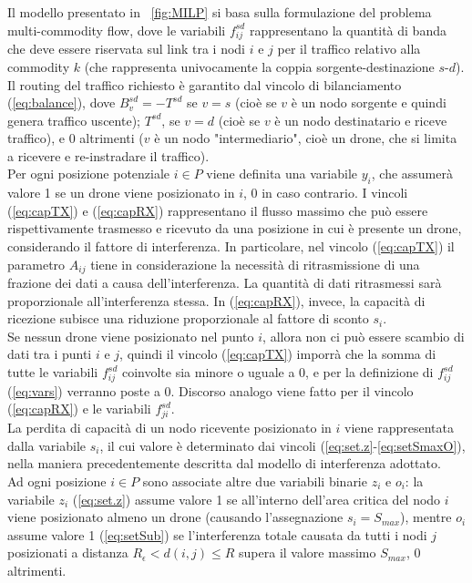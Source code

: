 %
Il modello presentato in \figurename\ \ref{fig:MILP} si basa sulla formulazione del problema multi-commodity flow, dove le variabili $f^{sd}_{ij}$ rappresentano la quantità di banda che deve essere riservata sul link tra i nodi $i$ e $j$ per il traffico relativo alla commodity $k$ (che rappresenta univocamente la coppia sorgente-destinazione $s$-$d$). \\
Il routing del traffico richiesto è garantito dal vincolo di bilanciamento (\ref{eq:balance}), dove $B^{sd}_{v} = - T^{sd}$ se $v = s$ (cioè se $v$ è un nodo sorgente e quindi genera traffico uscente); $T^{sd}$, se $v = d$ (cioè se $v$ è un nodo destinatario e riceve traffico), e 0 altrimenti ($v$ è un nodo "intermediario", cioè un drone, che si limita a ricevere e re-instradare il traffico). \\
Per ogni posizione potenziale $i \in P$ viene definita una variabile $y_i$, che assumerà valore 1 se un drone viene posizionato in $i$, 0 in caso contrario.   
I vincoli (\ref{eq:capTX}) e (\ref{eq:capRX}) rappresentano il flusso massimo che può essere rispettivamente trasmesso e ricevuto da una posizione in cui è presente un drone, considerando il fattore di interferenza. In particolare, nel vincolo (\ref{eq:capTX}) il parametro $A_{ij}$ tiene in considerazione la necessità di ritrasmissione di una frazione dei dati a causa dell'interferenza. 
La quantità di dati ritrasmessi sarà proporzionale all'interferenza stessa. In (\ref{eq:capRX}), invece, la capacità di ricezione subisce una riduzione proporzionale al fattore di sconto $s_i$. \\
Se nessun drone viene posizionato nel punto $i$, allora non ci può essere scambio di dati tra i punti $i$ e $j$, quindi il vincolo (\ref{eq:capTX}) imporrà che la somma di tutte le variabili $f^{sd}_{ij}$ coinvolte sia minore o uguale a 0, e per la definizione di $f^{sd}_{ij}$ (\ref{eq:vars}) verranno poste a 0.
Discorso analogo viene fatto per il vincolo (\ref{eq:capRX}) e le variabili  $f^{sd}_{ji}$.  \\
La perdita di capacità di un nodo ricevente posizionato in $i$ viene rappresentata dalla variabile $s_i$, il cui valore è determinato dai vincoli (\ref{eq:set.z}-\ref{eq:setSmaxO}), nella maniera precedentemente descritta dal modello di interferenza adottato. \\
Ad ogni posizione $i \in P$ sono associate altre due variabili binarie $z_i$ e $o_i$: la variabile $z_i$ (\ref{eq:set.z}) assume valore 1 se all'interno dell'area critica del nodo $i$ viene posizionato almeno un drone (causando l'assegnazione $s_i = S_{max}$), mentre $o_i$ assume valore 1 (\ref{eq:setSub}) se l'interferenza totale causata da tutti i nodi $j$ posizionati a distanza $R_\epsilon < d(i,j) \leq R$ supera il valore massimo $S_{max}$, 0 altrimenti. \\
